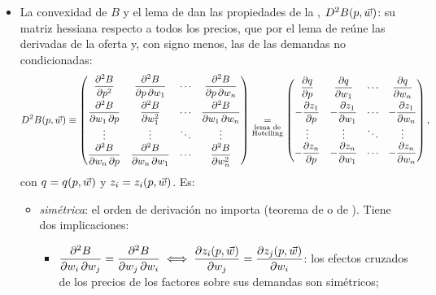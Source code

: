\documentclass[11pt]{article}
\begin{document}
\begin{itemize}
  \item La convexidad de $B$ y el lema de  dan las propiedades de la , $D^2B(p,\vec{w})$: su matriz hessiana respecto a todos los precios, que por el lema de  reúne las derivadas de la oferta y, con signo menos, las de las demandas no condicionadas:
    \begin{equation}
    D^2B(p,\vec{w})\equiv\begin{pmatrix}
    \dfrac{\partial^2B}{\partial p^2} & \dfrac{\partial^2B}{\partial p\,\partial w_1} & \cdots & \dfrac{\partial^2B}{\partial p\,\partial w_n}\\[8pt]
    \dfrac{\partial^2B}{\partial w_1\,\partial p} & \dfrac{\partial^2B}{\partial w_1^2} & \cdots & \dfrac{\partial^2B}{\partial w_1\,\partial w_n}\\
    \vdots & \vdots & \ddots & \vdots\\
    \dfrac{\partial^2B}{\partial w_n\,\partial p} & \dfrac{\partial^2B}{\partial w_n\,\partial w_1} & \cdots & \dfrac{\partial^2B}{\partial w_n^2}
    \end{pmatrix}
    \underset{\substack{\text{lema de}\\ \text{Hotelling}}}{=}
    \begin{pmatrix}
    \dfrac{\partial q}{\partial p} & \dfrac{\partial q}{\partial w_1} & \cdots & \dfrac{\partial q}{\partial w_n}\\[8pt]
    -\dfrac{\partial z_1}{\partial p} & -\dfrac{\partial z_1}{\partial w_1} & \cdots & -\dfrac{\partial z_1}{\partial w_n}\\
    \vdots & \vdots & \ddots & \vdots\\
    -\dfrac{\partial z_n}{\partial p} & -\dfrac{\partial z_n}{\partial w_1} & \cdots & -\dfrac{\partial z_n}{\partial w_n}
    \end{pmatrix}, \label{eq:matriz-beneficio}
    \end{equation}
    con $q=q(p,\vec{w})$ y $z_i=z_i(p,\vec{w})$. Es:
    \begin{itemize}
    \item \emph{simétrica}: el orden de derivación no importa (teorema de  o de ). Tiene dos implicaciones:
      \begin{itemize}
      \item $\dfrac{\partial^2B}{\partial w_i\,\partial w_j}=\dfrac{\partial^2B}{\partial w_j\,\partial w_i}\iff\dfrac{\partial z_i(p,\vec{w})}{\partial w_j}=\dfrac{\partial z_j(p,\vec{w})}{\partial w_i}$: los efectos cruzados de los precios de los factores sobre sus demandas son simétricos;

\end{itemize}
\end{itemize}
\end{itemize}
\end{document}
